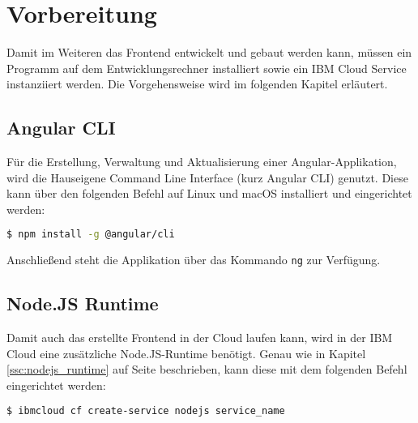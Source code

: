 \section{Vorbereitung}
Damit im Weiteren das Frontend entwickelt und gebaut werden kann, müssen ein Programm auf dem Entwicklungsrechner
installiert sowie ein IBM Cloud Service instanziiert werden. Die Vorgehensweise wird im folgenden Kapitel erläutert.

\subsection{Angular CLI}
Für die Erstellung, Verwaltung und Aktualisierung einer Angular-Applikation, wird die Hauseigene Command Line Interface
(kurz Angular CLI) genutzt. Diese kann über den folgenden Befehl auf Linux und macOS installiert und eingerichtet werden:

\begin{lstlisting}[language=bash, caption=Installation Angular CLI, label=Installation Angular CLI]
$ npm install -g @angular/cli
\end{lstlisting}

Anschließend steht die Applikation über das Kommando \texttt{ng} zur Verfügung.

\subsection{Node.JS Runtime}
Damit auch das erstellte Frontend in der Cloud laufen kann, wird in der IBM Cloud eine zusätzliche Node.JS-Runtime
benötigt. Genau wie in Kapitel \ref{ssc:nodejs_runtime} auf Seite \pageref{ssc:nodejs_runtime} beschrieben, kann diese
mit dem folgenden Befehl eingerichtet werden:

\begin{lstlisting}[language=bash, caption=Instanziierung der Node.JS Runtime, label=Instanziierung der Node.JS Runtime]
$ ibmcloud cf create-service nodejs service_name
\end{lstlisting}